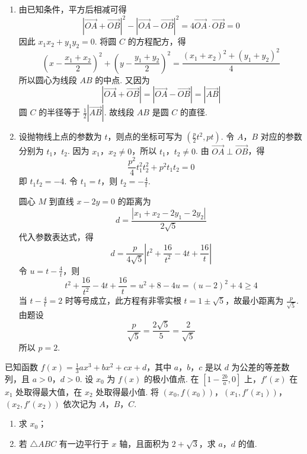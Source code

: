 \begin{solution}
\begin{enumerate}
\item 由已知条件，平方后相减可得
\[
\left|\overrightarrow{OA}+\overrightarrow{OB}\right|^2-\left|\overrightarrow{OA}-\overrightarrow{OB}\right|^2=4\overrightarrow{OA}\cdot\overrightarrow{OB}=0
\]
因此 \(x_1x_2+y_1y_2=0\). 将圆 \(C\) 的方程配方，得
\[
\left(x-\frac{x_1+x_2}{2}\right)^2+\left(y-\frac{y_1+y_2}{2}\right)^2=\frac{(x_1+x_2)^2+(y_1+y_2)^2}{4}
\]
所以圆心为线段 \(AB\) 的中点. 又因为
\[
\left|\overrightarrow{OA}+\overrightarrow{OB}\right|=\left|\overrightarrow{OA}-\overrightarrow{OB}\right|=|\overrightarrow{AB}|
\]
圆 \(C\) 的半径等于 \(\frac{1}{2}|\overrightarrow{AB}|\). 故线段 \(AB\) 是圆 \(C\) 的直径.

\item 设抛物线上点的参数为 \(t\)，则点的坐标可写为 \(\left(\frac{p}{2}t^2,pt\right)\). 令 \(A\)，\(B\) 对应的参数分别为 \(t_1\)，\(t_2\). 因为 \(x_1\)，\(x_2\neq0\)，所以 \(t_1\)，\(t_2\neq0\). 由 \(\overrightarrow{OA}\perp\overrightarrow{OB}\)，得
\[
\frac{p^2}{4}t_1^2t_2^2+p^2t_1t_2=0
\]
即 \(t_1t_2=-4\). 令 \(t_1=t\)，则 \(t_2=-\frac{4}{t}\).

圆心 \(M\) 到直线 \(x-2y=0\) 的距离为
\[
d=\frac{|x_1+x_2-2y_1-2y_2|}{2\sqrt{5}}
\]
代入参数表达式，得
\[
d=\frac{p}{4\sqrt{5}}\left|t^2+\frac{16}{t^2}-4t+\frac{16}{t}\right|
\]
令 \(u=t-\frac{4}{t}\)，则
\[
t^2+\frac{16}{t^2}-4t+\frac{16}{t}=u^2+8-4u=(u-2)^2+4\geqslant4
\]
当 \(t-\frac{4}{t}=2\) 时等号成立，此方程有非零实根 \(t=1\pm\sqrt{5}\)，故最小距离为 \(\frac{p}{\sqrt{5}}\). 由题设
\[
\frac{p}{\sqrt{5}}=\frac{2\sqrt{5}}{5}=\frac{2}{\sqrt{5}}
\]
所以 \(p=2\).
\end{enumerate}
\end{solution}

\begin{problem}
已知函数 \( f(x) = \frac{1}{3} ax^3 + bx^2 + cx + d \)，其中 \(a\)，\(b\)，\(c\) 是以 \(d\) 为公差的等差数列，且 \(a > 0\)，\(d > 0\). 设 \(x_0\) 为 \(f(x)\) 的极小值点. 在 \(\left[1 - \frac{2b}{a}, 0\right]\) 上，\(f'(x)\) 在 \(x_1\) 处取得最大值，在 \(x_2\) 处取得最小值. 将 \((x_0, f(x_0))\)，\((x_1, f'(x_1))\)，\((x_2, f'(x_2))\) 依次记为 \(A\)，\(B\)，\(C\).

\begin{enumerate}
\item 求 \(x_0\)；
\item 若 \(\triangle ABC\) 有一边平行于 \(x\) 轴，且面积为 \(2 + \sqrt{3}\)，求 \(a\)，\(d\) 的值.
\end{enumerate}
\end{problem}

